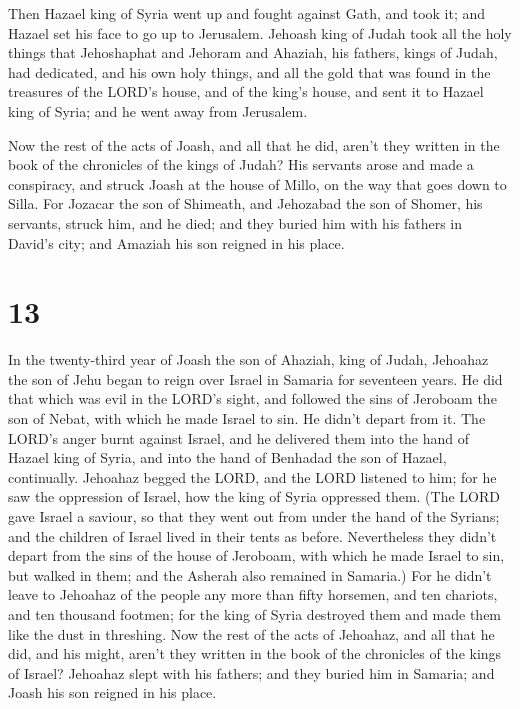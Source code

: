  Then Hazael king of Syria went up and fought against
Gath, and took it; and Hazael set his face to go up to Jerusalem.
 Jehoash king of Judah took all the holy things that
Jehoshaphat and Jehoram and Ahaziah, his fathers, kings of Judah, had
dedicated, and his own holy things, and all the gold that was found in
the treasures of the LORD's house, and of the king's house, and sent it
to Hazael king of Syria; and he went away from Jerusalem.

 Now the rest of the acts of Joash, and all that he did,
aren't they written in the book of the chronicles of the kings of Judah?
 His servants arose and made a conspiracy, and struck
Joash at the house of Millo, on the way that goes down to Silla.
 For Jozacar the son of Shimeath, and Jehozabad the son
of Shomer, his servants, struck him, and he died; and they buried him
with his fathers in David's city; and Amaziah his son reigned in his
place.

\hypertarget{section-12}{%
\section{13}\label{section-12}}

 In the twenty-third year of Joash the son of Ahaziah,
king of Judah, Jehoahaz the son of Jehu began to reign over Israel in
Samaria for seventeen years.  He did that which was evil
in the LORD's sight, and followed the sins of Jeroboam the son of Nebat,
with which he made Israel to sin. He didn't depart from it.
 The LORD's anger burnt against Israel, and he delivered
them into the hand of Hazael king of Syria, and into the hand of
Benhadad the son of Hazael, continually.  Jehoahaz begged
the LORD, and the LORD listened to him; for he saw the oppression of
Israel, how the king of Syria oppressed them.  (The LORD
gave Israel a saviour, so that they went out from under the hand of the
Syrians; and the children of Israel lived in their tents as before.
 Nevertheless they didn't depart from the sins of the
house of Jeroboam, with which he made Israel to sin, but walked in them;
and the Asherah also remained in Samaria.)  For he didn't
leave to Jehoahaz of the people any more than fifty horsemen, and ten
chariots, and ten thousand footmen; for the king of Syria destroyed them
and made them like the dust in threshing.  Now the rest of
the acts of Jehoahaz, and all that he did, and his might, aren't they
written in the book of the chronicles of the kings of Israel?
 Jehoahaz slept with his fathers; and they buried him in
Samaria; and Joash his son reigned in his place.

